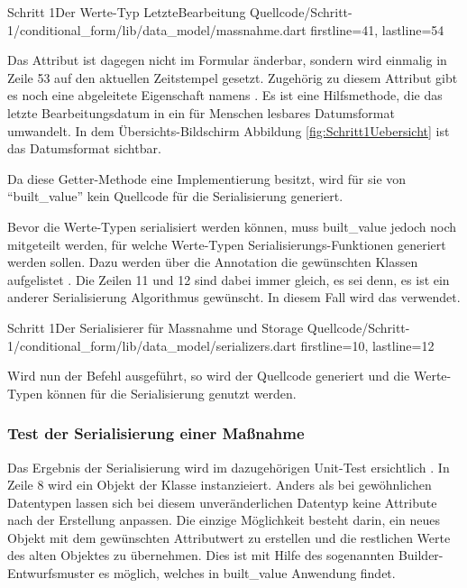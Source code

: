 \begin{alexlisting}{Schritt 1}{Der Werte-Typ LetzteBearbeitung}
  {Quellcode/Schritt-1/conditional_form/lib/data_model/massnahme.dart}
  {firstline=41, lastline=54}
  \label{lst:Schritt1WerteTypLetzteBearbeitung}
\end{alexlisting}

Das Attribut  ist dagegen nicht im Formular änderbar, sondern wird einmalig in Zeile 53 auf den aktuellen Zeitstempel gesetzt. Zugehörig zu diesem Attribut gibt es noch eine abgeleitete Eigenschaft namens  .  Es ist eine Hilfsmethode, die das letzte Bearbeitungsdatum in ein für Menschen lesbares Datumsformat umwandelt. In dem Übersichts-Bildschirm Abbildung \ref{fig:Schritt1Uebersicht} ist das Datumsformat sichtbar.

Da diese Getter-Methode eine Implementierung besitzt, wird für sie von \enquote{built_value} kein Quellcode für die Serialisierung generiert.

Bevor die Werte-Typen serialisiert werden können, muss built_value jedoch noch mitgeteilt werden, für welche Werte-Typen Serialisierungs-Funktionen generiert werden sollen. Dazu werden über die Annotation  die gewünschten Klassen aufgelistet . Die Zeilen 11 und 12 sind dabei immer gleich, es sei denn, es ist ein anderer Serialisierung Algorithmus gewünscht. In diesem Fall wird das verwendet. 

\begin{alexlisting}{Schritt 1}{Der Serialisierer für Massnahme und Storage}
  {Quellcode/Schritt-1/conditional_form/lib/data_model/serializers.dart}
  {firstline=10, lastline=12}
  \label{lst:Schritt1Serialisierer}
\end{alexlisting}


Wird nun der Befehl   ausgeführt, so wird der Quellcode generiert und die Werte-Typen können für die Serialisierung genutzt werden.

\subsubsection{Test der Serialisierung einer Maßnahme}

Das Ergebnis der Serialisierung wird im dazugehörigen Unit-Test ersichtlich \Lst{\ref{lst:SerialisierungEinerMassnahmeUnittest}}.
In Zeile 8 wird ein Objekt der Klasse  instanzieiert. Anders als bei gewöhnlichen Datentypen lassen sich bei diesem unveränderlichen Datentyp keine Attribute nach der Erstellung anpassen. Die einzige Möglichkeit besteht darin, ein neues Objekt  mit dem gewünschten Attributwert zu erstellen und die restlichen Werte des alten Objektes zu übernehmen. Dies ist mit Hilfe des sogenannten Builder-Entwurfsmuster es möglich, welches in built_value Anwendung findet. 

